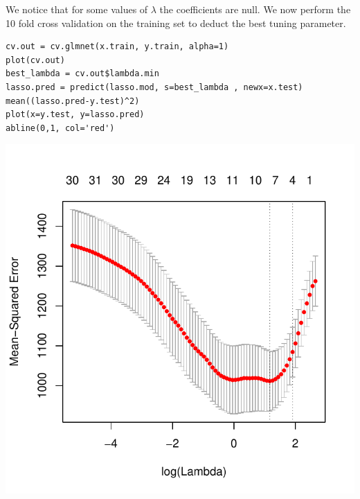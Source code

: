 \documentclass[]{report}
\begin{document}
We notice that for some values of $\lambda$ the coefficients are null. We now perform the 10 fold cross validation on the training set to deduct the best tuning parameter.

\begin{lstlisting}
cv.out = cv.glmnet(x.train, y.train, alpha=1)
plot(cv.out)
best_lambda = cv.out$lambda.min 
lasso.pred = predict(lasso.mod, s=best_lambda , newx=x.test)
mean((lasso.pred-y.test)^2)
plot(x=y.test, y=lasso.pred)
abline(0,1, col='red')
\end{lstlisting}

\begin{center}
	\includegraphics{Figures/lasso_mse.pdf}
\end{center}
\end{document}
